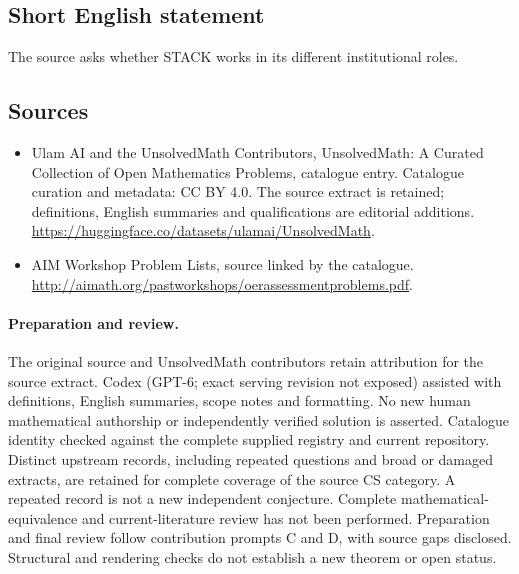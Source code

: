 \documentclass[11pt]{article}
\begin{document}
\subsection{Short English statement}
The source asks whether STACK works in its different institutional roles.
\subsection{Sources}
\begin{itemize}
\item[\hypertarget{source:statement:1}{S1}] Ulam AI and the UnsolvedMath Contributors, UnsolvedMath: A Curated Collection of Open Mathematics Problems, catalogue entry. Catalogue curation and metadata: CC BY 4.0. The source extract is retained; definitions, English summaries and qualifications are editorial additions.
\url{https://huggingface.co/datasets/ulamai/UnsolvedMath}.
\item[\hypertarget{source:statement:2}{S2}] AIM Workshop Problem Lists, source linked by the catalogue.
\url{http://aimath.org/pastworkshops/oerassessmentproblems.pdf}.
\end{itemize}
\paragraph{Preparation and review.}
The original source and UnsolvedMath contributors retain attribution for the source extract. Codex (GPT-6; exact serving revision not exposed) assisted with definitions, English summaries, scope notes and formatting. No new human mathematical authorship or independently verified solution is asserted. Catalogue identity checked against the complete supplied registry and current repository. Distinct upstream records, including repeated questions and broad or damaged extracts, are retained for complete coverage of the source CS category. A repeated record is not a new independent conjecture. Complete mathematical-equivalence and current-literature review has not been performed. Preparation and final review follow contribution prompts C and D, with source gaps disclosed. Structural and rendering checks do not establish a new theorem or open status.
\label{end:statement}
\end{document}
